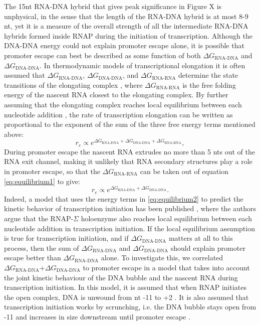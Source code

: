 \documentclass[a4paper]{article}
\begin{document}
The 15nt RNA-DNA hybrid that gives peak
significance in Figure X is unphysical, in the sense that the length of the
RNA-DNA hybrid is at most 8-9 nt, yet it is a measure of the overall strength of
all the intermediate RNA-DNA hybrids formed inside RNAP during the initiation of
transcription. Although the DNA-DNA energy could not explain promoter escape
alone, it is possible that promoter escape can best be described as some function
of both $\Delta G_{\text{RNA-DNA}}$ and $\Delta G_{\text{DNA-DNA}}$. In
thermodynamic models of transcriptional elongation it is often assumed that
$\Delta G_{\text{RNA-DNA}}$, $\Delta G_{\text{DNA-DNA}}$, and $\Delta
G_{\text{RNA-RNA}}$ determine the state transitions of the elongating complex
\cite{tadigotla_thermodynamic_2006}, where $\Delta G_{\text{RNA-RNA}}$ is the
free folding energy of the nascent RNA closest to the elongating complex.
By further assuming that the elongating complex reaches local equilibrium
between each nucleotide addition \cite{greive_thinking_2005}, the rate of
transcription elongation can be written as proportional to the exponent of the
sum of the three free energy terms mentioned above:
\begin{equation}
	\label{eq:equilibrium1}
	r_e \propto e^{\Delta G_{\text{RNA-DNA}}+\Delta
	G_{\text{DNA-DNA}}+\Delta G_{\text{RNA-RNA}}},
\end{equation}
During promoter escape the nascent RNA extrudes no more than 5 nts out of the
RNA exit channel, making it unlikely that RNA secondary structures play a role in
promoter escape, so that the $\Delta G_{\text{RNA-RNA}}$ can be taken out of
equation \eqref{eq:equilibrium1} to give:
\begin{equation}
	\label{eq:equilibrium2}
	r_e \propto e^{\Delta G_{\text{RNA-DNA}}+\Delta
	G_{\text{DNA-DNA}}}.
\end{equation}
Indeed, a model that uses the energy terms in \eqref{eq:equilibrium2} to
predict the kinetic behavior of transcription initiation has been published
\cite{xue_kinetic_2008}, where the authors argue that the RNAP-$\Sigma$
holoenzyme also reaches local equilibrium between each nucleotide addition in
transcription initiation. If the local equilibrium assumption is true for
transcription initiation, and if $\Delta G_{\text{DNA-DNA}}$ matters at all to
this process, then the sum of $\Delta G_{\text{RNA-DNA}}$ and $\Delta
G_{\text{DNA-DNA}}$ should explain promoter escape better than $\Delta
G_{\text{RNA-DNA}}$ alone. To investigate this, we correlated $\Delta
G_{\text{RNA-DNA}}$+$\Delta G_{\text{DNA-DNA}}$ to promoter escape in a model that
takes into account the joint kinetic behaviour of the DNA bubble and the nascent
RNA during transcription initiation. In this model, it is assumed
that when RNAP initiates the open complex, DNA is unwound from nt -11 to +2
\cite{borukhov_rna_2008}. It is also assumed that transcription initiation works by
scrunching, i.e. the DNA bubble stays open from -11 and increases in size
downstream until promoter escape \cite{revyakin_abortive_2006}.
\end{document}
